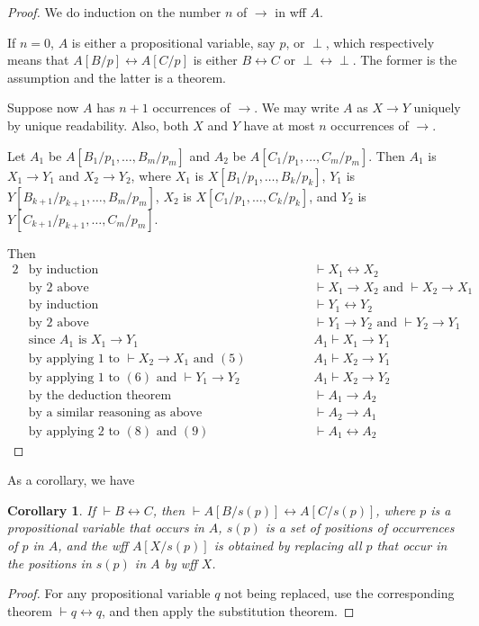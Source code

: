 \documentclass[12pt]{article}
\newtheorem{cor}{Corollary}
\begin{document}
\begin{proof}  We do induction on the number $n$ of $\to$ in wff $A$.  

If $n=0$, $A$ is either a propositional variable, say $p$, or $\perp$, which respectively means that $A[B/p]\leftrightarrow A[C/p]$ is either $B\leftrightarrow C$ or $\perp \leftrightarrow \perp$.  The former is the assumption and the latter is a theorem.

Suppose now $A$ has $n+1$ occurrences of $\to$.  We may write $A$ as $X\to Y$ uniquely by unique readability.  Also, both $X$ and $Y$ have at most $n$ occurrences of $\to$.

Let $A_1$ be $A[B_1/p_1,\ldots,B_m/p_m]$ and $A_2$ be $A[C_1/p_1,\ldots,C_m/p_m]$.  Then $A_1$ is $X_1\to Y_1$ and $X_2 \to Y_2$, where $X_1$ is $X[B_1/p_1,\ldots, B_k/p_k]$, $Y_1$ is $Y[B_{k+1}/p_{k+1},\ldots, B_m/p_m]$, $X_2$ is $X[C_1/p_1,\ldots, C_k/p_k]$, and $Y_2$ is $Y[C_{k+1}/p_{k+1},\ldots, C_m/p_m]$.

Then
\begin{alignat}{2}
&\mbox{by induction} & \vdash X_1\leftrightarrow X_2 \\ 
&\mbox{by 2 above} & \vdash X_1\to X_2 \mbox{ and } \vdash X_2\to X_1 \\ 
&\mbox{by induction} & \vdash Y_1\leftrightarrow Y_2 \\ 
&\mbox{by 2 above} & \vdash Y_1\to Y_2 \mbox{ and } \vdash Y_2\to Y_1 \\ 
&\mbox{since } A_1\mbox{ is }X_1\to Y_1 & A_1\vdash X_1\to Y_1 \\ 
&\mbox{by applying 1 to }\vdash X_2\to X_1 \mbox{ and } (5) \qquad\qquad\qquad\qquad & A_1\vdash X_2\to Y_1 \\ 
&\mbox{by applying 1 to }(6) \mbox{ and } \vdash Y_1\to Y_2 & A_1\vdash X_2\to Y_2 \\ 
&\mbox{by the deduction theorem} & \vdash A_1\to A_2 \\
&\mbox{by a similar reasoning as above} & \vdash A_2\to A_1 \\
&\mbox{by applying 2 to }(8)\mbox{ and }(9) & \vdash A_1\leftrightarrow A_2
\end{alignat}
\end{proof}
As a corollary, we have
\begin{cor} If $\vdash B\leftrightarrow C$, then $\vdash A[B/s(p)] \leftrightarrow A[C/s(p)]$, where $p$ is a propositional variable that occurs in $A$, $s(p)$ is a set of positions of occurrences of $p$ in $A$, and the wff $A[X/s(p)]$ is obtained by replacing all $p$ that occur in the positions in $s(p)$ in $A$ by wff $X$.
\end{cor}
\begin{proof} For any propositional variable $q$ not being replaced, use the corresponding theorem $\vdash q\leftrightarrow q$, and then apply the substitution theorem. \end{proof}
\end{document}
